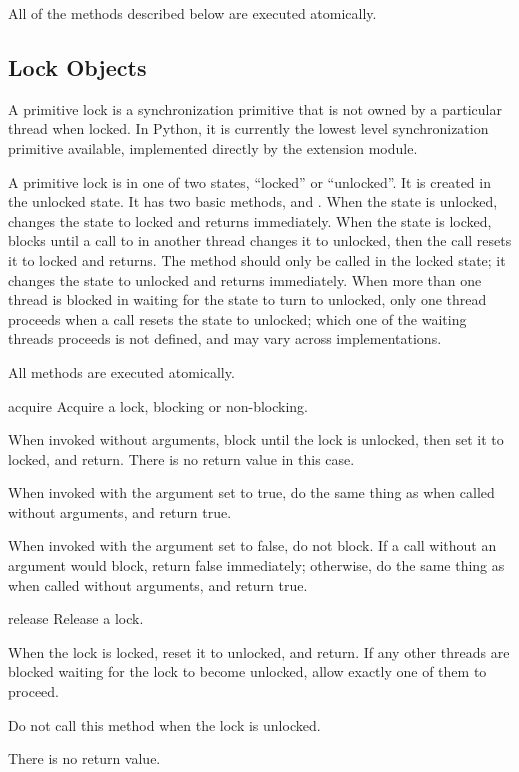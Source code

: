 All of the methods described below are executed atomically.


\subsection{Lock Objects \label{lock-objects}}

A primitive lock is a synchronization primitive that is not owned
by a particular thread when locked.  In Python, it is currently
the lowest level synchronization primitive available, implemented
directly by the  extension module.

A primitive lock is in one of two states, ``locked'' or ``unlocked''.
It is created in the unlocked state.  It has two basic methods,
 and .  When the state is
unlocked,  changes the state to locked and returns
immediately.  When the state is locked,  blocks
until a call to  in another thread changes it to
unlocked, then the  call resets it to locked and
returns.  The  method should only be called in the
locked state; it changes the state to unlocked and returns
immediately.  When more than one thread is blocked in
 waiting for the state to turn to unlocked, only one
thread proceeds when a  call resets the state to
unlocked; which one of the waiting threads proceeds is not defined,
and may vary across implementations.

All methods are executed atomically.

\begin{methoddesc}{acquire}{}
Acquire a lock, blocking or non-blocking.

When invoked without arguments, block until the lock is
unlocked, then set it to locked, and return.  There is no
return value in this case.

When invoked with the  argument set to true, do the
same thing as when called without arguments, and return true.

When invoked with the  argument set to false, do not
block.  If a call without an argument would block, return false
immediately; otherwise, do the same thing as when called
without arguments, and return true.
\end{methoddesc}

\begin{methoddesc}{release}{}
Release a lock.

When the lock is locked, reset it to unlocked, and return.  If
any other threads are blocked waiting for the lock to become
unlocked, allow exactly one of them to proceed.

Do not call this method when the lock is unlocked.

There is no return value.
\end{methoddesc}


